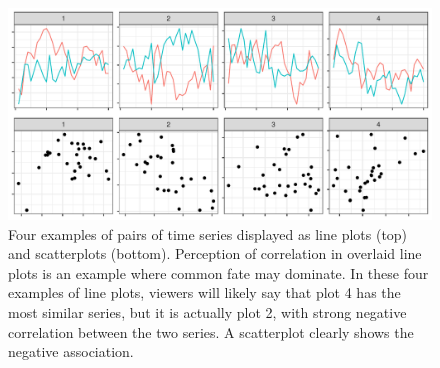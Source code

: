 \documentclass[letterpaper]{ar-1col}\usepackage[]{graphicx}\usepackage[]{color}
\newenvironment{knitrout}{}{} %
\begin{document}
\begin{knitrout}
\color{fgcolor}\begin{figure}
\includegraphics[width=\textwidth]{figure/commonfate-1} \caption[Four examples of pairs of time series displayed as line plots (top) and scatterplots (bottom)]{Four examples of pairs of time series displayed as line plots (top) and scatterplots (bottom). Perception of correlation in overlaid line plots is an example where common fate may dominate. In these four examples of line plots, viewers will likely say that plot 4 has the most similar series, but it is actually plot 2, with strong negative correlation between the two series. A scatterplot clearly shows the negative association.}\label{fig:commonfate}
\end{figure}


\end{knitrout}

\end{document}

